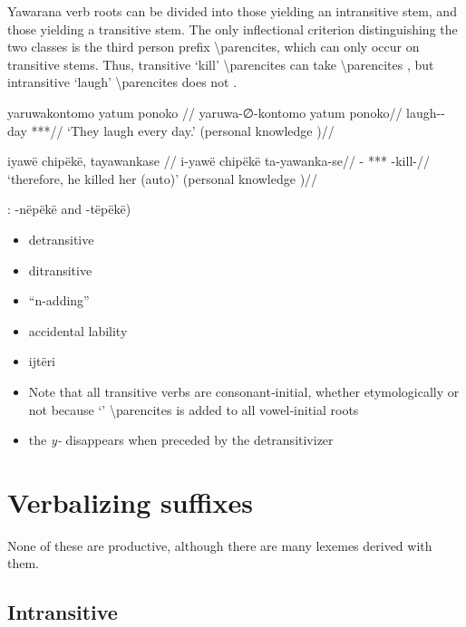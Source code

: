 \documentclass{memoir}
\begin{document}
Yawarana verb roots can be divided into those yielding an intransitive
stem, and those yielding a transitive stem. The only inflectional
criterion distinguishing the two classes is the third person prefix
 \textbackslash parencites, which can only occur on transitive
stems. Thus, transitive  `kill' \textbackslash parencites
can take  \textbackslash parencites ,
but intransitive  `laugh' \textbackslash parencites does not
.

\pex    
\a \label{convrisamaj-42}
\begingl \glpreamble yaruwakontomo yatum ponoko //
\gla yaruwa-∅-kontomo yatum ponoko//
\glb laugh-- day ***//
\glft ‘They laugh every day.’ (personal knowledge
)//
\endgl

    
\a \label{convfemgrme-217}
\begingl \glpreamble iyawë chipëkë, tayawankase //
\gla i-yawë chipëkë ta-yawanka-se//
\glb {}- *** -kill-//
\glft ‘therefore, he killed her (auto)’ (personal knowledge
)//
\endgl

\xe

: -nëpëkë and -tëpëkë)

\begin{itemize}
\item
  detransitive
\item
  ditransitive
\item
  ``n-adding''
\item
  accidental lability
\item
  ijtëri
\item
  Note that all transitive verbs are consonant‑initial, whether
  etymologically or not because  `'
  \textbackslash parencites is added to all vowel‑initial roots
\item
  the \emph{y‑} disappears when preceded by the detransitivizer
\end{itemize}

\section{\texorpdfstring{Verbalizing suffixes
\label{sec:vbz}}{Verbalizing suffixes }}

None of these are productive, although there are many lexemes derived
with them.

\subsection{Intransitive}
\end{document}
